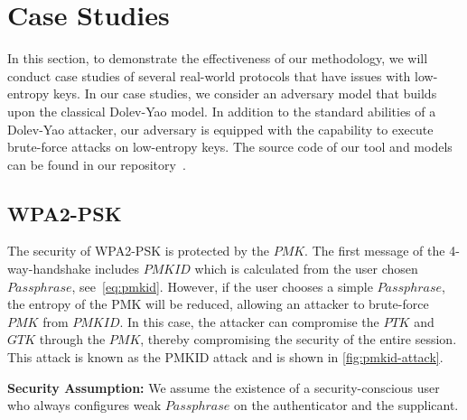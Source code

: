 \section{ Case Studies } \label{sec:5case-study}

In this section, to demonstrate the effectiveness of our methodology, we will conduct case studies of several real-world protocols that have issues with low-entropy keys. 
In our case studies, we consider an adversary model that builds upon the classical Dolev-Yao model. 
In addition to the standard abilities of a Dolev-Yao attacker, our adversary is equipped with the
capability to execute brute-force attacks on low-entropy keys.
The source code of our tool and models can be found in our repository~\cite{toolrepo}.

\subsection{WPA2-PSK} \label{sec:wpa2-psk}

The security of WPA2-PSK is protected by the $PMK$. 
The first message of the 4-way-handshake includes $PMKID$ which is calculated from the user chosen $Passphrase$, see~\autoref{eq:pmkid}. 
However, if the user chooses a simple $Passphrase$, the entropy of the PMK will be reduced, allowing an attacker to brute-force $PMK$ from $PMKID$. 
In this case, the attacker can compromise the $PTK$ and $GTK$ through the $PMK$, thereby compromising the security of the entire session. 
This attack is known as the PMKID attack\cite{pmkidattack} and is shown in \autoref{fig:pmkid-attack}. 


\noindent
\textbf{Security Assumption:} 
We assume the existence of a security-conscious user who always configures weak $Passphrase$ on the authenticator and the supplicant.

